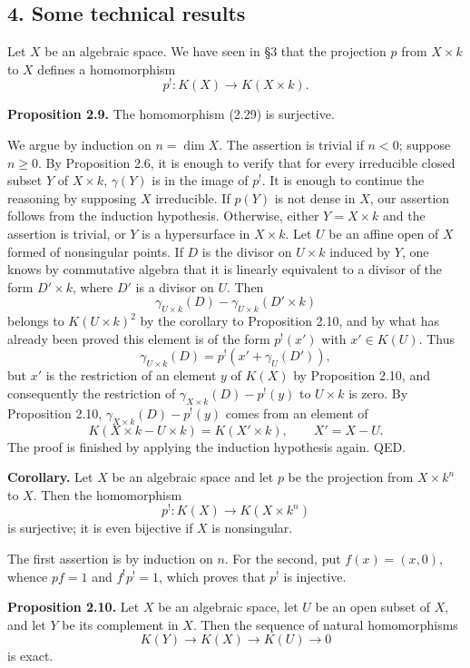 \documentclass[11pt]{article}
\begin{document}
\subsection*{4. Some technical results}

Let $X$ be an algebraic space. We have seen in \S 3 that the projection $p$ from $X\times k$ to $X$ defines a homomorphism
\begin{equation}\tag{2.29}
 p^!:K(X)\longrightarrow K(X\times k).
\end{equation}

\textbf{Proposition 2.9.} The homomorphism (2.29) is surjective.

We argue by induction on $n=\dim X$. The assertion is trivial if $n<0$; suppose $n\geq 0$. By Proposition 2.6, it is enough to verify that for every irreducible closed subset $Y$ of $X\times k$, $\gamma(Y)$ is in the image of $p^!$. It is enough to continue the reasoning by supposing $X$ irreducible. If $p(Y)$ is not dense in $X$, our assertion follows from the induction hypothesis. Otherwise, either $Y=X\times k$ and the assertion is trivial, or $Y$ is a hypersurface in $X\times k$. Let $U$ be an affine open of $X$ formed of nonsingular points. If $D$ is the divisor on $U\times k$ induced by $Y$, one knows by commutative algebra that it is linearly equivalent to a divisor of the form $D'\times k$, where $D'$ is a divisor on $U$. Then
\[
 \gamma_{U\times k}(D)-\gamma_{U\times k}(D'\times k)
\]
belongs to $K(U\times k)^2$ by the corollary to Proposition 2.10, and by what has already been proved this element is of the form $p^!(x')$ with $x'\in K(U)$. Thus
\[
 \gamma_{U\times k}(D)=p^!(x'+\gamma_U(D')),
\]
but $x'$ is the restriction of an element $y$ of $K(X)$ by Proposition 2.10, and consequently the restriction of $\gamma_{X\times k}(D)-p^!(y)$ to $U\times k$ is zero. By Proposition 2.10, $\gamma_{X\times k}(D)-p^!(y)$ comes from an element of
\[
 K(X\times k-U\times k)=K(X'\times k),\qquad X'=X-U.
\]
The proof is finished by applying the induction hypothesis again. QED.

\textbf{Corollary.} Let $X$ be an algebraic space and let $p$ be the projection from $X\times k^n$ to $X$. Then the homomorphism
\[
 p^!:K(X)\longrightarrow K(X\times k^n)
\]
is surjective; it is even bijective if $X$ is nonsingular.

The first assertion is by induction on $n$. For the second, put $f(x)=(x,0)$, whence $pf=1$ and $f^!p^!=1$, which proves that $p^!$ is injective.

\textbf{Proposition 2.10.} Let $X$ be an algebraic space, let $U$ be an open subset of $X$, and let $Y$ be its complement in $X$. Then the sequence of natural homomorphisms
\begin{equation}\tag{2.30}
 K(Y)\longrightarrow K(X)\longrightarrow K(U)\longrightarrow 0
\end{equation}
is exact.
\end{document}
